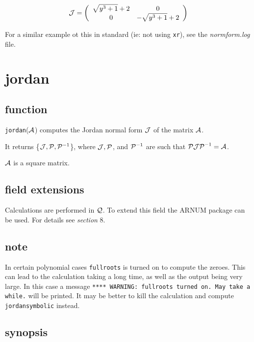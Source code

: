 \vspace{0.2in}
\begin{displaymath}
{\cal J} = \left( \begin{array}{cc} \sqrt{y^3+1} + 2 & 0 \\ 0 & 
-\sqrt{y^3+1} + 2 \end{array} \right)
\end{displaymath}

\vspace{0.2in}
For a similar example ot this in standard {\REDUCE} (ie: not using 
{\tt xr}), see the {\it normform.log} file.

\vspace{0.5in}

\section{jordan}

\subsection{function}

{\tt jordan}(${\cal A}$) computes the Jordan normal form 
${\cal J}$ of the matrix ${\cal A}$.

It returns \{${\cal J}, {\cal P}, {\cal P}^{-1}$\}, where 
${\cal J}, {\cal P}$, and ${\cal P}^{-1}$ are such that ${\cal P J P}^
{-1} = {\cal A}$. 

${\cal A}$ is a square matrix.

\subsection{field extensions}

Calculations are performed in ${\cal Q}$. To extend this field the 
{\small ARNUM} package can be used. For details see {\it section} 8.

\subsection{note}
In certain polynomial cases {\tt fullroots} is turned on to compute the 
zeroes. This can lead to the calculation taking a long time, as well as 
the output being very large. In this case a message {\tt ***** WARNING: 
fullroots turned on. May take a while.} will be printed. It may be 
better to kill the calculation and compute {\tt jordansymbolic} instead.

\subsection{synopsis}

